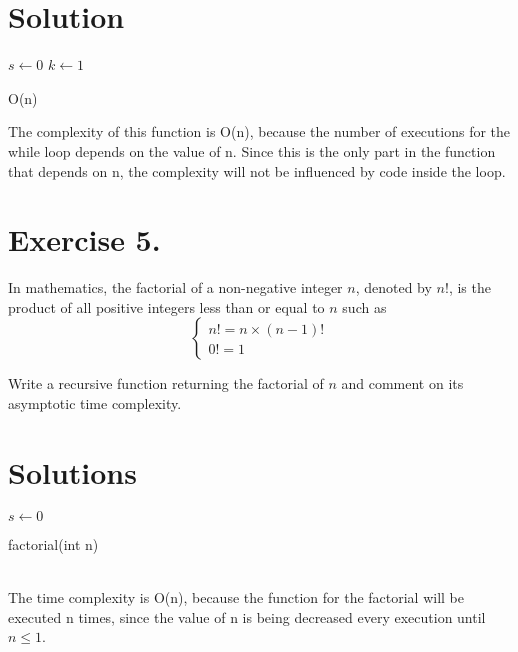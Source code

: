 \documentclass{article}
\begin{document}
\section*{Solution}
\begin{minipage}[t]{5cm}
  \vspace{0pt}
  \begin{function}[H]
\DontPrintSemicolon
{}
  $s \leftarrow 0$\;
  $k \leftarrow 1$\;
 \caption{O(n)}
\end{function}
\end{minipage}%

The complexity of this function is O(n), because the number of executions for the while loop depends on the value of n. Since this is the only part in the function that depends on n, the complexity will not be influenced by code inside the loop.

\section*{Exercise 5.}
In mathematics, the factorial of a non-negative integer $n$, denoted by $n!$, is the product of all positive integers less than or equal to $n$ such as
\begin{equation}
\left\{
\begin{array}{l}
 n! = n \times (n-1)!\\
 0! = 1
\end{array}
\right.
\end{equation}

Write a recursive function returning the factorial of $n$ and comment on its asymptotic time complexity.

\section*{Solutions}
\begin{minipage}[t]{5cm}
  \vspace{0pt}
  \begin{function}[H]
\DontPrintSemicolon
{}
  $s \leftarrow 0 $\;
	\;
 \caption{factorial(int n)}
\end{function}
\end{minipage}%
\\
The time complexity is O(n), because the function for the factorial will be executed n times, since the value of n is being decreased every execution until $n \leq 1$.
\end{document}
